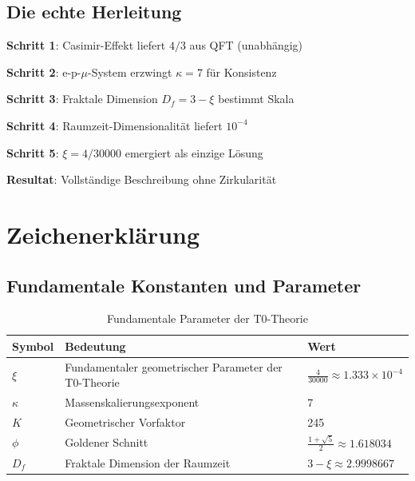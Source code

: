 	\subsection{Die echte Herleitung}
	
	\begin{tcolorbox}[colback=green!5!white,colframe=green!75!black,title={Fundamentale Herleitung}]
		\textbf{Schritt 1}: Casimir-Effekt liefert $4/3$ aus QFT (unabhängig)
		
		\textbf{Schritt 2}: e-p-$\mu$-System erzwingt $\kappa = 7$ für Konsistenz
		
		\textbf{Schritt 3}: Fraktale Dimension $D_f = 3 - \xi$ bestimmt Skala
		
		\textbf{Schritt 4}: Raumzeit-Dimensionalität liefert $10^{-4}$
		
		\textbf{Schritt 5}: $\xi = 4/30000$ emergiert als einzige Lösung
		
		\textbf{Resultat}: Vollständige Beschreibung ohne Zirkularität
	\end{tcolorbox}
	
	\appendix
	\section{Zeichenerklärung}
	
	\subsection{Fundamentale Konstanten und Parameter}
	
	\begin{table}[htbp]
		\centering
		\begin{tabular}{p{3cm}p{8cm}p{3cm}}
			\toprule
			\textbf{Symbol} & \textbf{Bedeutung} & \textbf{Wert} \\
			\midrule
			$\xi$ & Fundamentaler geometrischer Parameter der T0-Theorie & $\frac{4}{30000} \approx 1.333\times10^{-4}$ \\
			$\kappa$ & Massenskalierungsexponent & 7 \\
			$K$ & Geometrischer Vorfaktor & 245 \\
			$\phi$ & Goldener Schnitt & $\frac{1+\sqrt{5}}{2} \approx 1.618034$ \\
			$D_f$ & Fraktale Dimension der Raumzeit & $3 - \xi \approx 2.9998667$ \\
			\bottomrule
		\end{tabular}
		\caption{Fundamentale Parameter der T0-Theorie}
	\end{table}
	
